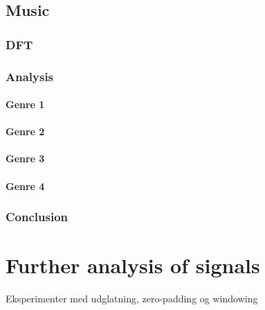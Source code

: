 \subsection{Music}
\subsubsection{DFT}

\subsubsection{Analysis}

\paragraph{Genre 1}

\paragraph{Genre 2}

\paragraph{Genre 3}

\paragraph{Genre 4}

\subsubsection{Conclusion}

\section{Further analysis of signals}
Eksperimenter med udglatning, zero-padding og windowing 

